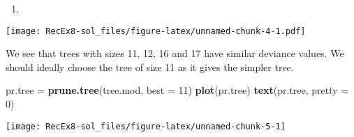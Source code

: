\documentclass[]{article}
\newenvironment{Shaded}{\begin{snugshade}}{\end{snugshade}}
\newcommand{\DataTypeTok}[1]{\textcolor[rgb]{0.13,0.29,0.53}{#1}}
\newcommand{\DecValTok}[1]{\textcolor[rgb]{0.00,0.00,0.81}{#1}}
\newcommand{\KeywordTok}[1]{\textcolor[rgb]{0.13,0.29,0.53}{\textbf{#1}}}
\newcommand{\NormalTok}[1]{#1}
\newcommand{\OperatorTok}[1]{\textcolor[rgb]{0.81,0.36,0.00}{\textbf{#1}}}
\newcommand{\StringTok}[1]{\textcolor[rgb]{0.31,0.60,0.02}{#1}}
\begin{document}
\begin{enumerate}
\def\labelenumi{\alph{enumi})}
\setcounter{enumi}{2}
\item
\end{enumerate}

\begin{Shaded}
\end{Shaded}

\texttt{[image: RecEx8-sol\_files/figure-latex/unnamed-chunk-4-1.pdf]}

We see that trees with sizes 11, 12, 16 and 17 have similar deviance
values. We should ideally choose the tree of size 11 as it gives the
simpler tree.

\begin{Shaded}
\begin{Highlighting}[]
\NormalTok{pr.tree =}\StringTok{ }\KeywordTok{prune.tree}\NormalTok{(tree.mod, }\DataTypeTok{best =} \DecValTok{11}\NormalTok{)}
\KeywordTok{plot}\NormalTok{(pr.tree)}
\KeywordTok{text}\NormalTok{(pr.tree, }\DataTypeTok{pretty =} \DecValTok{0}\NormalTok{)}
\end{Highlighting}
\end{Shaded}

\texttt{[image: RecEx8-sol\_files/figure-latex/unnamed-chunk-5-1]}

\begin{Shaded}
\end{Shaded}
\end{document}
